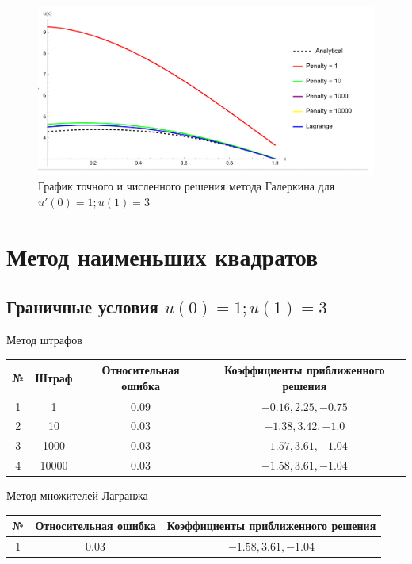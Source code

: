 \documentclass[12pt,a4paper]{article}
\begin{document}
\begin{figure}[h]
	\centering
	\includegraphics[width=1\textwidth]{m-2-3.PNG}
	\caption{График точного и численного решения метода Галеркина для $u'(0) = 1; u(1) = 3$}
\end{figure}


    \pagebreak

    \section{Метод наименьших квадратов}

   	\subsection{Граничные условия $u(0) = 1; u(1) = 3$}

\begin{center}
	Метод штрафов
	\begin{tabular}{|c|c|c|c|} 
		\hline
		№ & Штраф & Относительная ошибка & Коэффициенты приближенного решения \\ 
		\hline
		1 & 1 &$0.09$ & ${-0.16,2.25,-0.75}$ \\ 
		\hline
		2 & 10 &$0.03$ & ${-1.38,3.42,-1.0}$ \\ 
		\hline
		3 & 1000 &$0.03$ & ${-1.57,3.61,-1.04}$ \\ 
		\hline
		4 & 10000 &$0.03$ & ${-1.58,3.61,-1.04}$ \\ 
		\hline
	\end{tabular}
\end{center}

\begin{center}
	Метод множителей Лагранжа
	\begin{tabular}{|c|c|c|} 
		\hline
		№ & Относительная ошибка & Коэффициенты приближенного решения \\ 
		\hline
		1 & $0.03$ & ${-1.58,3.61,-1.04}$ \\ 
		\hline
	\end{tabular}
\end{center}
\end{document}
